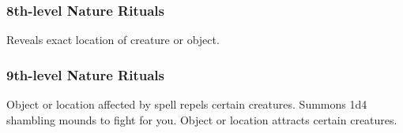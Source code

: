 \subsubsection{8th-level Nature Rituals}
\begin{rituallist}
     Reveals exact location of creature or object.
\end{rituallist}

\subsubsection{9th-level Nature Rituals}
\begin{rituallist}
     Object or location affected by spell repels certain creatures.
     Summons 1d4 shambling mounds to fight for you.
     Object or location attracts certain creatures.
\end{rituallist}

